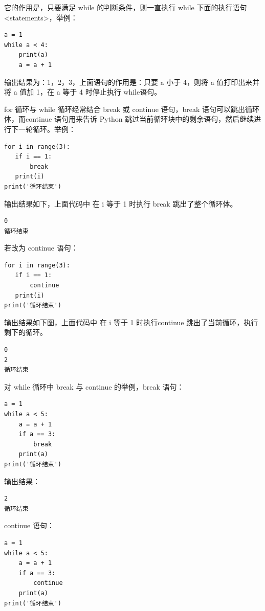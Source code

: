它的作用是，只要满足 while 的判断条件，则一直执行 while 下面的执行语句 <statements>，举例：

\begin{lstlisting}[Language=Python]
a = 1
while a < 4:
    print(a)
    a = a + 1
\end{lstlisting}

输出结果为：1，2，3，上面语句的作用是：只要 a 小于 4，则将 a 值打印出来并将 a 值加 1，在 a 等于 4 时停止执行 while语句。

for 循环与 while 循环经常结合 break 或 continue 语句，break 语句可以跳出循环体，而continue 语句用来告诉 Python 跳过当前循环块中的剩余语句，然后继续进行下一轮循环。举例：

\begin{lstlisting}[Language=Python]
for i in range(3):
   if i == 1:
       break
   print(i)
print('循环结束')
\end{lstlisting}

输出结果如下，上面代码中 在 i 等于 1 时执行 break 跳出了整个循环体。

\begin{lstlisting}[Language=Python]
0
循环结束
\end{lstlisting}

若改为 continue 语句：
\begin{lstlisting}[Language=Python]
for i in range(3):
   if i == 1:
       continue
   print(i)
print('循环结束')
\end{lstlisting}

输出结果如下图，上面代码中 在 i 等于 1 时执行continue 跳出了当前循环，执行剩下的循环。

\begin{lstlisting}[Language=Python]
0
2
循环结束
\end{lstlisting}


对 while 循环中 break 与 continue 的举例，break 语句：

\begin{lstlisting}[Language=Python]
a = 1
while a < 5:
    a = a + 1
    if a == 3:
        break
    print(a)
print('循环结束')
\end{lstlisting}

输出结果：

\begin{lstlisting}[Language=Python]
2
循环结束
\end{lstlisting}

continue 语句：
\begin{lstlisting}[Language=Python]
a = 1
while a < 5:
    a = a + 1
    if a == 3:
        continue
    print(a)
print('循环结束')
\end{lstlisting}

